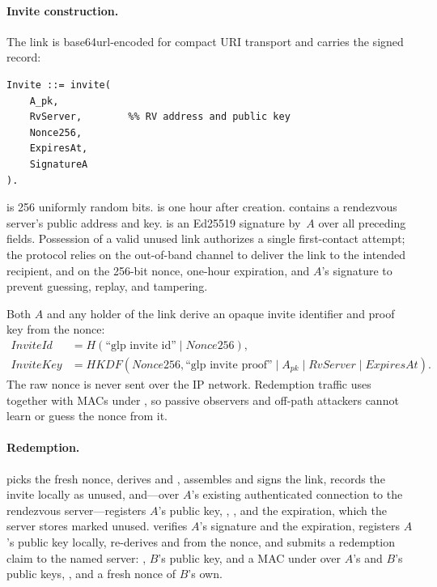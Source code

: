 \paragraph{Invite construction.}
The link is base64url-encoded for compact URI transport and carries the signed record:
\begin{verbatim}
Invite ::= invite(
    A_pk,
    RvServer,        %% RV address and public key
    Nonce256,
    ExpiresAt,
    SignatureA
).
\end{verbatim}
\noindent {} is 256 uniformly random bits.   is one hour after creation.   contains a rendezvous server's public address and key.   is an Ed25519 signature by~$A$ over all preceding fields.  Possession of a valid unused link authorizes a single first-contact attempt; the protocol relies on the out-of-band channel to deliver the link to the intended recipient, and on the 256-bit nonce, one-hour expiration, and $A$'s signature to prevent guessing, replay, and tampering.

Both $A$ and any holder of the link derive an opaque invite identifier and proof key from the nonce:
\[
\begin{aligned}
\mathit{InviteId}  &= H(\text{``glp invite id''} \mid \mathit{Nonce256}),\\
\mathit{InviteKey} &= \mathit{HKDF}(\mathit{Nonce256},
    \text{``glp invite proof''} \mid A_{\mathit{pk}} \mid
    \mathit{RvServer} \mid \mathit{ExpiresAt}).
\end{aligned}
\]
The raw nonce is never sent over the IP network.  Redemption traffic uses  together with MACs under , so passive observers and off-path attackers cannot learn or guess the nonce from it.

\paragraph{Redemption.}
 picks the fresh nonce, derives  and , assembles and signs the link, records the invite locally as unused, and---over $A$'s existing authenticated connection to the rendezvous server---registers $A$'s public key, , , and the expiration, which the server stores marked unused.   verifies $A$'s signature and the expiration, registers $A$'s public key locally, re-derives  and  from the nonce, and submits a redemption claim to the named server: , $B$'s public key, and a MAC under  over $A$'s and $B$'s public keys, , and a fresh nonce of $B$'s own.

